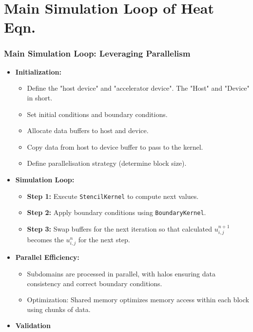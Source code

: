 \documentclass[9pt]{beamer}
\begin{document}
\section{Main Simulation Loop of Heat Eqn.}
\begin{frame}
\frametitle{Main Simulation Loop: Leveraging Parallelism}
\begin{itemize}
    \item \textbf{Initialization:}
    \begin{itemize}
        \item Define the "host device" and "accelerator device". The "Host" and "Device" in short.
        \item Set initial conditions and boundary conditions.
        \item Allocate data buffers to host and device.
        \item Copy data from host to device buffer to pass to the kernel.
        \item Define parallelisation strategy (determine block size).
    \end{itemize}
    \item \textbf{Simulation Loop:}
    \begin{itemize}
        \item \textbf{Step 1:} Execute \texttt{StencilKernel} to compute next values.
        \item \textbf{Step 2:} Apply boundary conditions using \texttt{BoundaryKernel}.
        \item \textbf{Step 3:} Swap buffers for the next iteration so that calculated  $u_{i,j}^{n+1}$ becomes the $u_{i,j}^{n}$ for the next step.
    \end{itemize}
    \item \textbf{Parallel Efficiency:}
    \begin{itemize}
        \item Subdomains are processed in parallel, with halos ensuring data consistency and correct boundary conditions.
        \item Optimization: Shared memory optimizes memory access within each block using chunks of data.
    \end{itemize}
    \item \textbf{Validation}
\end{itemize}
\end{frame}
\end{document}
